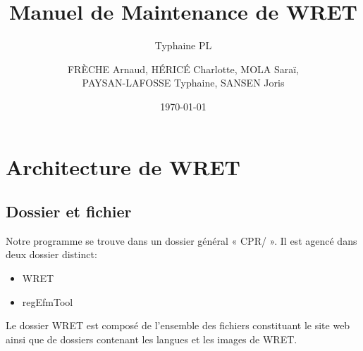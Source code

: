 \documentclass[12pt,a4paper]{report}
\author{Typhaine PL}
\date{\today}
\author{}
\title{}
\title{Manuel de Maintenance de WRET}
\author{\textsc{FR\`ECHE} Arnaud, \textsc{H\'ERIC\'E} Charlotte, \textsc{MOLA} Saraï,\\ \textsc{PAYSAN-LAFOSSE} Typhaine, \textsc{SANSEN} Joris}
\begin{document}
\tableofcontents

\chapter{Architecture de WRET}
\section{Dossier et fichier}

Notre programme se trouve dans un dossier général « CPR/ ». Il est agencé dans deux dossier distinct: \\
\begin{itemize}
\item WRET
\item regEfmTool
\end{itemize} 

Le dossier WRET est composé de l'ensemble des fichiers constituant le site web ainsi que de dossiers contenant les langues et les images de WRET.\\
\end{document}
